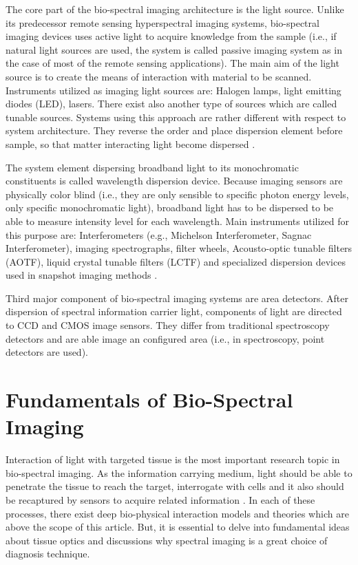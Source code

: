 \documentclass[a4paper]{article}
\begin{document}
    \hspace{5mm} The core part of the bio-spectral imaging architecture is the light source. Unlike its predecessor remote sensing hyperspectral imaging systems, bio-spectral imaging devices uses active light to acquire knowledge from the sample (i.e., if natural light sources are used, the system is called passive imaging system as in the case of most of the remote sensing applications). The main aim of the light source is to create the means of interaction with material to be scanned. Instruments utilized as imaging light sources are: Halogen lamps, light emitting diodes (LED), lasers. There exist also another type of sources which are called tunable sources. Systems using this approach are rather different with respect to system architecture. They reverse the order and place dispersion element before sample, so that matter interacting light become dispersed \cite{sifir}.
    
    \medskip
    \hspace{5mm} The system element dispersing broadband light to its monochromatic constituents is called wavelength dispersion device. Because imaging sensors are physically color blind (i.e., they are only sensible to specific photon energy levels, only specific monochromatic light), broadband light has to be dispersed to be able to measure intensity level for each wavelength. Main instruments utilized for this purpose are: Interferometers (e.g., Michelson Interferometer, Sagnac Interferometer), imaging spectrographs, filter wheels, Acousto-optic tunable filters (AOTF), liquid crystal tunable filters (LCTF) and specialized dispersion devices used in snapshot imaging methods \cite{bes} \cite{sifir}.
    
    \medskip
    \hspace{5mm} Third major component of bio-spectral imaging systems are area detectors. After dispersion of spectral information carrier light, components of light are directed to CCD and CMOS image sensors. They differ from traditional spectroscopy detectors and are able image an configured area (i.e., in spectroscopy, point detectors are used).
						
										

 \section{Fundamentals of Bio-Spectral Imaging} %
    \label{sec:Fundamentals_of_Bio-Spectral_Imaging}
    \hspace{5mm} Interaction of light with targeted tissue is the most important research topic in bio-spectral imaging. As the information carrying medium, light should be able to penetrate the tissue to reach the target, interrogate with cells and it also should be recaptured by sensors to acquire related information \cite{bes.1}. In each of these processes, there exist deep bio-physical interaction models and theories which are above the scope of this article. But, it is essential to delve into fundamental ideas about tissue optics and discussions why spectral imaging is a great choice of diagnosis technique.  
    
\end{document}
